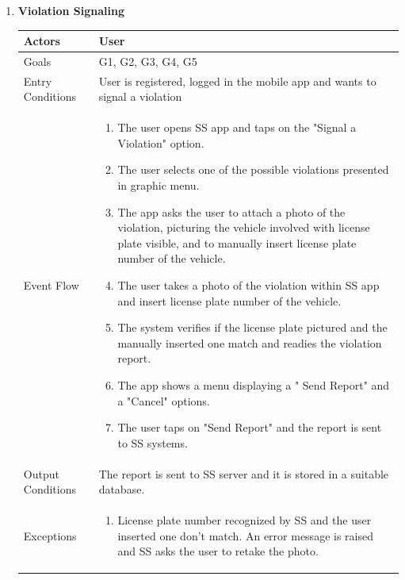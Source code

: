 \begin{enumerate}
	\item \textbf{Violation Signaling}
		\begin{table}[h!]
		\centering
		\begin{tabular}{|l|p{}|}
		\hline
		Actors            			&       	User\\ \hline
		Goals             			&         G1, G2, G3, G4, G5	\\ \hline
		Entry Conditions  	&  		User is registered, logged in the mobile app and wants to signal a violation\\ \hline
		Event Flow        		&          
				\begin{enumerate}[label=\alph*)]
					\item The user opens SS app and taps on the "Signal a Violation" option.
					\item The user selects one of the possible violations presented in graphic menu.
					\item The app asks the user to attach a photo of the violation, picturing the vehicle involved with license plate visible, and to manually insert license plate number of the vehicle.
					\item The user takes a photo of the violation within SS app and insert license plate number of the vehicle.
					\item The system verifies if the license plate pictured and the manually inserted one match and readies the violation report. 
					\item The app shows a menu displaying a " Send Report" and a "Cancel" options.
					\item The user taps on "Send Report" and the report is sent to SS systems.
					\end{enumerate}\\ \hline
		Output Conditions &    		The report is sent to SS server and it is stored in a suitable database.\\ \hline
		Exceptions        		&       	
				\begin{enumerate}[label=\alph*)]
					\item License plate number recognized by SS and the user inserted one don't match. An error message is raised and SS asks the user to retake the photo.
				\end{enumerate}\\ \hline
	\end{tabular}
	\end{table}
	

\end{enumerate}
